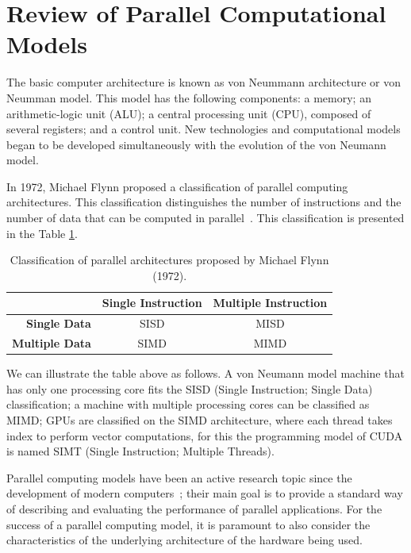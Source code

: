 \section{Review of Parallel Computational Models}
\label{sec:BackgroundModel}

The basic computer architecture is known as von Neummann architecture or von Neumman model. This model has the following components: a memory; an arithmetic-logic unit (ALU); a central processing unit (CPU), composed of several registers; and a control unit. New technologies and computational models began to be developed simultaneously with the evolution of the von Neumann model. 

In 1972, Michael Flynn proposed a classification of parallel computing architectures. This classification distinguishes the number of instructions and the number of data that can be computed in parallel~\citep{flynn1996parallel}. This classification is presented in the Table \ref{tab:taxFlynn}.

\begin{table}[htpb]
\begin{center}
\begin{tabular}{|r|c|c|}
\hline
& \bf Single Instruction & \bf Multiple Instruction\\\hline 
\bf Single Data & SISD & MISD \\\hline 
\bf Multiple Data & SIMD & MIMD \\\hline 
\end{tabular}
\end{center}
\caption{Classification of parallel architectures proposed by Michael Flynn (1972).} 
\label{tab:taxFlynn}
\end{table}

We can illustrate the table above as follows. A von Neumann model machine that has only one processing core fits the SISD (Single Instruction; Single Data) classification; a machine with multiple processing cores can be classified as MIMD; GPUs are classified on the SIMD architecture, where each thread takes index to perform vector computations, for this the programming model of CUDA is named SIMT (Single Instruction; Multiple Threads).

Parallel computing models have been an active research topic since the development of modern computers~\citep{Gibbons1983:QRQW,Juurlink:1998,Skillicorn:1998:MLP}; their main goal is to provide a standard way of describing and evaluating the performance of parallel applications. For the success of a parallel computing model, it is paramount to also consider the characteristics of the underlying architecture of the hardware being used.



